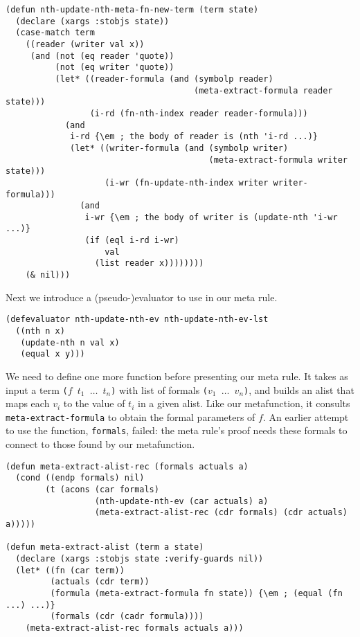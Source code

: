 \begin{Verbatim}[commandchars=\\\{\},fontsize=\small]
(defun nth-update-nth-meta-fn-new-term (term state)
  (declare (xargs :stobjs state))
  (case-match term
    ((reader (writer val x))
     (and (not (eq reader 'quote))
          (not (eq writer 'quote))
          (let* ((reader-formula (and (symbolp reader)
                                      (meta-extract-formula reader state)))
                 (i-rd (fn-nth-index reader reader-formula)))
            (and
             i-rd {\em ; the body of reader is (nth 'i-rd ...)}
             (let* ((writer-formula (and (symbolp writer)
                                         (meta-extract-formula writer state)))
                    (i-wr (fn-update-nth-index writer writer-formula)))
               (and
                i-wr {\em ; the body of writer is (update-nth 'i-wr ...)}
                (if (eql i-rd i-wr)
                    val
                  (list reader x))))))))
    (& nil)))
\end{Verbatim}

Next we introduce a (pseudo-)evaluator to use in our meta rule.

\begin{verbatim}
(defevaluator nth-update-nth-ev nth-update-nth-ev-lst
  ((nth n x)
   (update-nth n val x)
   (equal x y)))
\end{verbatim}

We need to define one more function before presenting our meta rule.
It takes as input a term {\tt ($f$ $t_1$ $\ldots$ $t_n$)} with list of
formals {\tt ($v_1$ $\ldots$ $v_n$)}, and builds an alist that maps
each $v_i$ to the value of $t_i$ in a given alist.  Like our
metafunction, it consults {\tt meta-extract-formula} to obtain the
formal parameters of $f$.  An earlier attempt to use the function,
{\tt formals}, failed: the meta rule's proof needs these formals to
connect to those found by our metafunction.

\begin{Verbatim}[commandchars=\\\{\},fontsize=\small]
(defun meta-extract-alist-rec (formals actuals a)
  (cond ((endp formals) nil)
        (t (acons (car formals)
                  (nth-update-nth-ev (car actuals) a)
                  (meta-extract-alist-rec (cdr formals) (cdr actuals) a)))))

(defun meta-extract-alist (term a state)
  (declare (xargs :stobjs state :verify-guards nil))
  (let* ((fn (car term))
         (actuals (cdr term))
         (formula (meta-extract-formula fn state)) {\em ; (equal (fn ...) ...)}
         (formals (cdr (cadr formula))))
    (meta-extract-alist-rec formals actuals a)))
\end{Verbatim}

